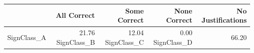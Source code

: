 \begin{tabular}{lrrrr}
\toprule
 & All Correct & Some Correct & None Correct & No Justifications \\
\midrule
SignClass_A & 21.76%
SignClass_B & 12.04%
SignClass_C & 0.00%
SignClass_D & 66.20%
\bottomrule
\end{tabular}
